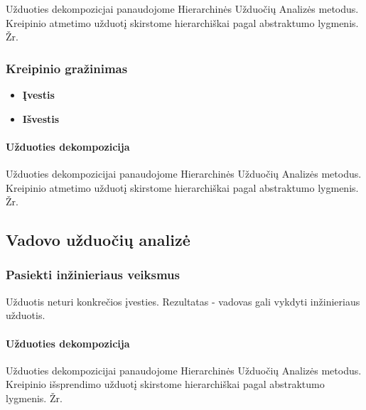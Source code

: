 	Užduoties dekompozicjai panaudojome Hierarchinės Užduočių Analizės metodus.
	Kreipinio atmetimo užduotį skirstome hierarchiškai pagal abstraktumo lygmenis. 
	Žr. 
	
 		
	\subsubsection{Kreipinio gražinimas}	
	
		\begin{itemize}
			\item \textbf{Įvestis}
			\item \textbf{Išvestis} 
		\end{itemize}


	\paragraph{Užduoties dekompozicija} 


	Užduoties dekompozicijai panaudojome Hierarchinės Užduočių Analizės metodus.
	Kreipinio atmetimo užduotį skirstome hierarchiškai pagal abstraktumo lygmenis. 
	Žr. 
	
 		
\subsection{Vadovo užduočių analizė}

	\subsubsection{Pasiekti inžinieriaus veiksmus}

	Užduotis neturi konkrečios įvesties. 
	Rezultatas - vadovas gali vykdyti inžinieriaus užduotis.
		
		
	\paragraph{Užduoties dekompozicija}
	

	Užduoties dekompozicijai panaudojome Hierarchinės Užduočių Analizės metodus.
	Kreipinio išsprendimo užduotį skirstome hierarchiškai pagal abstraktumo lygmenis. 
	Žr. 
 		
